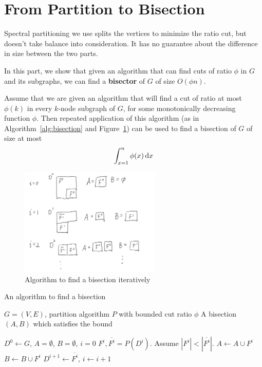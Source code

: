 \documentclass[11pt]{article}
\begin{document}
\section{From Partition to Bisection}\label{bisection}

Spectral partitioning we use splits the vertices to minimize the ratio cut, but doesn't take balance into consideration. It has no guarantee about the difference in size between the two parts.

In this part, we show that given an algorithm that can find cuts of ratio $\phi$ in $G$ and its subgraphs, we can find a \textbf{bisector} of $G$ of size $O(\phi n)$.

\begin{lemma}\label{A1_lemma}
Assume that we are given an algorithm that will find a cut of ratio at most $\phi(k)$ in every $k$-node subgraph of $G$, for some monotonically decreasing function $\phi$. Then repeated application of this algorithm (as in Algorithm~\ref{alg:bisection} and Figure~\ref{fig:bisection}) can be used to find a bisection of $G$ of size at most
$$
\int_{x=1}^n \phi(x) \dif x
$$
\end{lemma}

\begin{figure}
\centering
\includegraphics[width=0.6\textwidth]{figures/bisection.jpg}
\caption{Algorithm to find a bisection iteratively}
\label{fig:bisection}
\end{figure}

\begin{algorithm}
\caption{An algorithm to find a bisection}\label{alg:bisection}
\begin{algorithmic}[1]
\Require $G=(V,E)$, partition algorithm $P$ with bounded cut ratio $\phi$
\Ensure A bisection $(A, B)$ which satisfies the bound

\State $D^0 \gets G$, $A=\emptyset$, $B=\emptyset$, $i=0$
    \State $F^i,\overline{F^i} = P(D^i)$. Assume $|F^i| < |\overline{F^i}|$.
        \State $A \gets A \cup F^i$
    \Else
        \State $B \gets B \cup F^i$
    \EndIf
    \State $D^{i+1} \gets \overline{F^i}$, $i \gets i+1$
\EndWhile
\end{algorithmic}
\end{algorithm}
\end{document}

